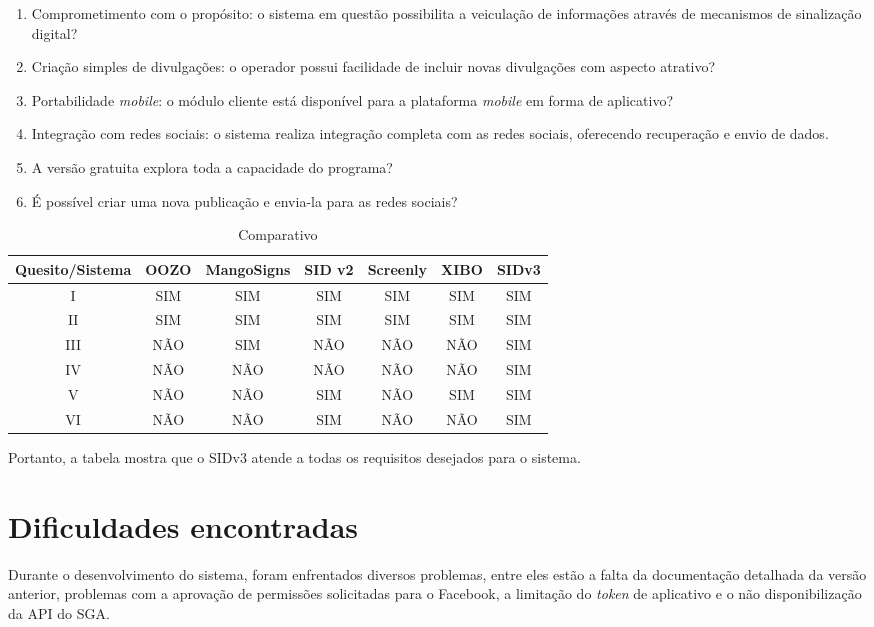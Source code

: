 \begin{enumerate}[label=\Roman*)]
\label{tlb:comparacaoresultados}
	\item Comprometimento com o propósito: o sistema em questão possibilita a veiculação de informações através de mecanismos de sinalização digital?
	\item Criação simples de divulgações: o operador possui facilidade de incluir novas divulgações com aspecto atrativo?
	\item Portabilidade \textit{mobile}: o módulo cliente está disponível para a plataforma \textit{mobile} em forma de aplicativo?
	\item Integração com redes sociais: o sistema realiza integração completa com as redes sociais, oferecendo recuperação e envio de dados.
	\item A versão gratuita explora toda a capacidade do programa?
	\item É possível criar uma nova publicação e envia-la para as redes sociais?
\end{enumerate}

\begin{table}[h!]
	\caption{Comparativo}
	\label {tlb:comparativo2}
	\centering
	\begin{tabular}{|c|c|c|c|c|c|c|}
		\hline
		Quesito/Sistema & OOZO & MangoSigns & SID v2 & Screenly & XIBO & SIDv3 \\ \hline
		I 				& SIM  & SIM		& SIM & SIM 	 & SIM	& SIM \\ \hline
		II 				& SIM  & SIM 		& SIM & SIM 	 & SIM		& SIM \\ \hline
		III				& NÃO  & SIM 		& NÃO & NÃO 	 & NÃO		& SIM \\ \hline
		IV 				& NÃO  & NÃO 		& NÃO & NÃO 	 & NÃO		& SIM \\ \hline
		V 				& NÃO  & NÃO 		& SIM & NÃO 	 & SIM		& SIM \\ \hline
		VI 				& NÃO  & NÃO 		& SIM & NÃO 	 & NÃO		& SIM \\ \hline
	\end{tabular}
\end{table}

Portanto, a tabela mostra que o SIDv3 atende a todas os requisitos desejados para o sistema.

\section{Dificuldades encontradas}
Durante o desenvolvimento do sistema, foram enfrentados diversos problemas, entre eles estão a falta da documentação detalhada da versão anterior, problemas com a aprovação de permissões solicitadas para o Facebook, a limitação do \textit{token} de aplicativo e o não disponibilização da API do SGA.


